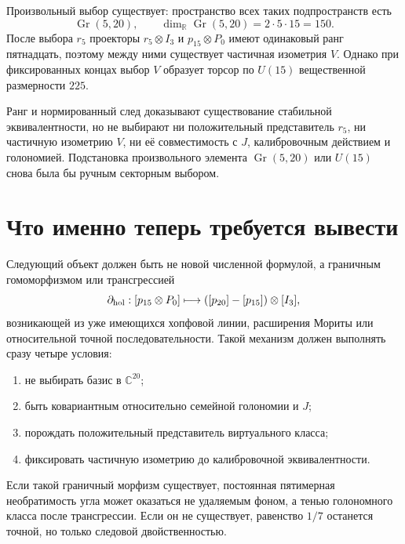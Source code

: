 Произвольный выбор существует: пространство всех таких подпространств
есть
\begin{equation}
 \operatorname{Gr}(5,20),
 \qquad
 \dim_{\mathbb R}\operatorname{Gr}(5,20)=2\cdot5\cdot15=150.
\end{equation}
После выбора $r_5$ проекторы $r_5\otimes I_3$ и
$p_{15}\otimes P_0$ имеют одинаковый ранг пятнадцать, поэтому между ними
существует частичная изометрия $V$. Однако при фиксированных концах выбор
$V$ образует торсор по $U(15)$ вещественной размерности $225$.

\begin{nogocriterion}
Ранг и нормированный след доказывают существование стабильной
эквивалентности, но не выбирают ни положительный представитель $r_5$, ни
частичную изометрию $V$, ни её совместимость с $J$, калибровочным
действием и голономией. Подстановка произвольного элемента
$\operatorname{Gr}(5,20)$ или $U(15)$ снова была бы ручным секторным
выбором.
\end{nogocriterion}

\section{Что именно теперь требуется вывести}

Следующий объект должен быть не новой численной формулой, а граничным
гомоморфизмом или трансгрессией
\begin{equation}
 \partial_{\rm hol}:
 [p_{15}\otimes P_0]
 \longmapsto
 ([p_{20}]-[p_{15}])\otimes[I_3],
 \label{eq:v5-one-seventh-transgression-target}
\end{equation}
возникающей из уже имеющихся хопфовой линии, расширения Мориты или
относительной точной последовательности. Такой механизм должен выполнять
сразу четыре условия:
\begin{enumerate}
 \item не выбирать базис в $\mathbb C^{20}$;
 \item быть ковариантным относительно семейной голономии и $J$;
 \item порождать положительный представитель виртуального класса;
 \item фиксировать частичную изометрию до калибровочной эквивалентности.
\end{enumerate}

Если такой граничный морфизм существует, постоянная пятимерная
необратимость угла может оказаться не удаляемым фоном, а тенью
голономного класса после трансгрессии. Если он не существует, равенство
$1/7$ останется точной, но только следовой двойственностью.

